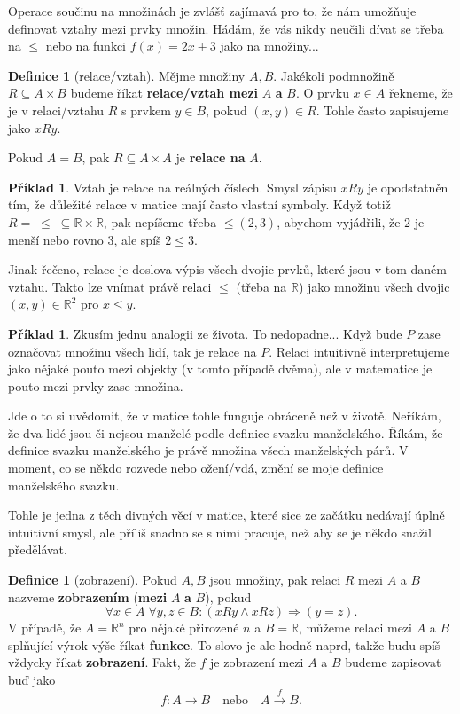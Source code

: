 \documentclass[a4paper,11pt]{article}
\theoremstyle{definition}
\newtheorem{exm}[thm]{Příklad}
\newtheorem{dfn}[thm]{Definice}
\theoremstyle{plain}
\newcommand{\R}{\mathbb{R}}
\begin{document}
Operace součinu na množinách je zvlášť zajímavá pro to, že nám umožňuje
definovat vztahy mezi prvky množin. Hádám, že vás nikdy neučili dívat se třeba
na $ \leq $ nebo na funkci $f(x) = 2x + 3$ jako na množiny...

\begin{dfn}[relace/vztah]
 Mějme množiny $A,B$. Jakékoli podmnožině $R \subseteq A \times B$ budeme říkat
 \textbf{relace/vztah mezi} $A$ \textbf{a} $B$. O prvku $x \in A$ řekneme, že je
 v relaci/vztahu $R$ s prvkem $y \in B$, pokud $(x,y) \in R$. Tohle často
 zapisujeme jako $xRy$.

 Pokud $A = B$, pak $R \subseteq A \times A$ je \textbf{relace na} $A$.
\end{dfn}

\begin{exm}
 Vztah  je relace na reálných číslech. Smysl zápisu $xRy$
 je opodstatněn tím, že důležité relace v matice mají často vlastní symboly.
 Když totiž $R = \; \leq \; \subseteq \R \times \R$, pak nepíšeme třeba $
 \leq\!\!(2,3)$, abychom vyjádřili, že $2$ je menší nebo rovno $3$, ale spíš $2
 \leq 3$.
\end{exm}

Jinak řečeno, relace je doslova výpis všech dvojic prvků, které jsou v tom daném
vztahu. Takto lze vnímat právě relaci $ \leq $ (třeba na $\R$) jako množinu
všech dvojic ${(x,y) \in \R^2}$ pro $x \leq y$.

\begin{exm}
 Zkusím jednu analogii ze života. To nedopadne... Když bude $P$ zase označovat
 množinu všech lidí, tak  je relace na $P$. Relaci
 intuitivně interpretujeme jako nějaké pouto mezi objekty (v tomto případě
 dvěma), ale v matematice je pouto mezi prvky zase množina.

 Jde o to si uvědomit, že v matice tohle funguje obráceně než v životě. Neříkám,
 že dva lidé jsou či nejsou manželé podle definice svazku manželského. Říkám, že
 definice svazku manželského je právě množina všech manželských párů. V moment,
 co se někdo rozvede nebo ožení/vdá, změní se moje definice manželského svazku.

 Tohle je jedna z těch divných věcí v matice, které sice ze začátku nedávají
 úplně intuitivní smysl, ale příliš snadno se s nimi pracuje, než aby se je
 někdo snažil předělávat.
\end{exm}

\begin{dfn}[zobrazení]
 Pokud $A,B$ jsou množiny, pak relaci $R$ mezi $A$ a $B$ nazveme
 \textbf{zobrazením} (\textbf{mezi} $A$ \textbf{a} $B$), pokud
 \[
  \forall x \in A \; \forall y,z \in B: (xRy \wedge xRz) \Rightarrow (y = z).
 \]
 V případě, že $A = \R^{n}$ pro nějaké přirozené $n$ a $B = \R$, můžeme relaci
 mezi $A$ a $B$ splňující výrok výše říkat \textbf{funkce}. To slovo je ale
 hodně naprd, takže budu spíš vždycky říkat \textbf{zobrazení}. Fakt, že $f$ je
 zobrazení mezi $A$ a $B$ budeme zapisovat buď jako
 \[
  f:A \to B \quad \text{nebo} \quad A \overset{f}{\longrightarrow} B.
 \]
\end{dfn}
\end{document}
